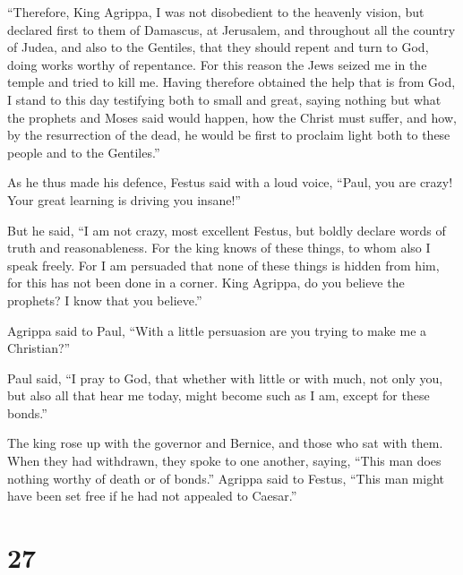  ``Therefore, King Agrippa, I was not disobedient to the
heavenly vision,  but declared first to them of Damascus,
at Jerusalem, and throughout all the country of Judea, and also to the
Gentiles, that they should repent and turn to God, doing works worthy of
repentance.  For this reason the Jews seized me in the
temple and tried to kill me.  Having therefore obtained
the help that is from God, I stand to this day testifying both to small
and great, saying nothing but what the prophets and Moses said would
happen,  how the Christ must suffer, and how, by the
resurrection of the dead, he would be first to proclaim light both to
these people and to the Gentiles.''

 As he thus made his defence, Festus said with a loud
voice, ``Paul, you are crazy! Your great learning is driving you
insane!''

 But he said, ``I am not crazy, most excellent Festus,
but boldly declare words of truth and reasonableness. 
For the king knows of these things, to whom also I speak freely. For I
am persuaded that none of these things is hidden from him, for this has
not been done in a corner.  King Agrippa, do you believe
the prophets? I know that you believe.''

 Agrippa said to Paul, ``With a little persuasion are you
trying to make me a Christian?''

 Paul said, ``I pray to God, that whether with little or
with much, not only you, but also all that hear me today, might become
such as I am, except for these bonds.''

 The king rose up with the governor and Bernice, and
those who sat with them.  When they had withdrawn, they
spoke to one another, saying, ``This man does nothing worthy of death or
of bonds.''  Agrippa said to Festus, ``This man might
have been set free if he had not appealed to Caesar.''

\hypertarget{section-26}{%
\section{27}\label{section-26}}

